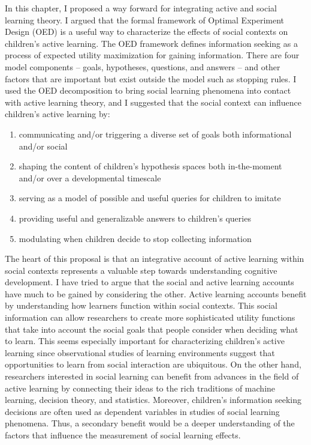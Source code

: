 \documentclass[oneside]{report}
\begin{document}
In this chapter, I proposed a way forward for integrating active and
social learning theory. I argued that the formal framework of Optimal
Experiment Design (OED) is a useful way to characterize the effects of
social contexts on children's active learning. The OED framework defines
information seeking as a process of expected utility maximization for
gaining information. There are four model components -- goals,
hypotheses, questions, and answers -- and other factors that are
important but exist outside the model such as stopping rules. I used the
OED decomposition to bring social learning phenomena into contact with
active learning theory, and I suggested that the social context can
influence children's active learning by:
\begin{enumerate}
\def\labelenumi{\arabic{enumi}.}
\tightlist
\item
  communicating and/or triggering a diverse set of goals both
  informational and/or social
\item
  shaping the content of children's hypothesis spaces both in-the-moment
  and/or over a developmental timescale
\item
  serving as a model of possible and useful queries for children to
  imitate
\item
  providing useful and generalizable answers to children's queries
\item
  modulating when children decide to stop collecting information
\end{enumerate}
The heart of this proposal is that an integrative account of active
learning within social contexts represents a valuable step towards
understanding cognitive development. I have tried to argue that the
social and active learning accounts have much to be gained by
considering the other. Active learning accounts benefit by understanding
how learners function within social contexts. This social information
can allow researchers to create more sophisticated utility functions
that take into account the social goals that people consider when
deciding what to learn. This seems especially important for
characterizing children's active learning since observational studies of
learning environments suggest that opportunities to learn from social
interaction are ubiquitous. On the other hand, researchers interested in
social learning can benefit from advances in the field of active
learning by connecting their ideas to the rich traditions of machine
learning, decision theory, and statistics. Moreover, children's
information seeking decisions are often used as dependent variables in
studies of social learning phenomena. Thus, a secondary benefit would be
a deeper understanding of the factors that influence the measurement of
social learning effects.
\end{document}
